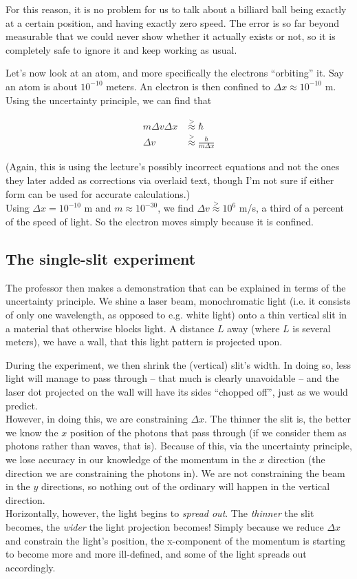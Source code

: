 For this reason, it is no problem for us to talk about a billiard ball being exactly at a certain position, and having exactly zero speed. The error is so far beyond measurable that we could never show whether it actually exists or not, so it is completely safe to ignore it and keep working as usual.

Let's now look at an atom, and more specifically the electrons ``orbiting'' it. Say an atom is about $10^{-10}$ meters. An electron is then confined to $\Delta x \approx 10^{-10}$ m. Using the uncertainty principle, we can find that

\begin{align}
m \Delta v \Delta x &\overset{>}{\approx} \hbar\\
\Delta v  &\overset{>}{\approx} \frac{\hbar}{m \Delta x}
\end{align}

(Again, this is using the lecture's possibly incorrect equations and not the ones they later added as corrections via overlaid text, though I'm not sure if either form can be used for accurate calculations.)\\
Using $\Delta x = 10^{-10}$ m and $m \approx 10^{-30}$, we find $\Delta v \overset{>}{\approx} 10^6$ m/s, a third of a percent of the speed of light. So the electron moves simply because it is confined.

\subsection{The single-slit experiment}

The professor then makes a demonstration that can be explained in terms of the uncertainty principle. We shine a laser beam, monochromatic light (i.e. it consists of only one wavelength, as opposed to e.g. white light) onto a thin vertical slit in a material that otherwise blocks light. A distance $L$ away (where $L$ is several meters), we have a wall, that this light pattern is projected upon.

During the experiment, we then shrink the (vertical) slit's width. In doing so, less light will manage to pass through -- that much is clearly unavoidable -- and the laser dot projected on the wall will have its sides ``chopped off'', just as we would predict.\\
However, in doing this, we are constraining $\Delta x$. The thinner the slit is, the better we know the $x$ position of the photons that pass through (if we consider them as photons rather than waves, that is). Because of this, via the uncertainty principle, we lose accuracy in our knowledge of the momentum in the $x$ direction (the direction we are constraining the photons in).
We are not constraining the beam in the $y$ directions, so nothing out of the ordinary will happen in the vertical direction.\\
Horizontally, however, the light begins to \emph{spread out}. The \emph{thinner} the slit becomes, the \emph{wider} the light projection becomes! Simply because we reduce $\Delta x$ and constrain the light's position, the x-component of the momentum is starting to become more and more ill-defined, and some of the light spreads out accordingly.

